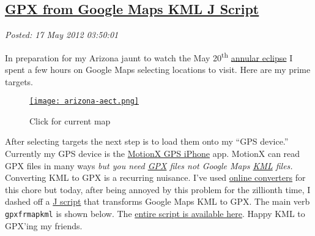 %

\subsection*{\href{https://bakerjd99.wordpress.com/2012/05/16/gpx-from-google-maps-kml-j-script/}{GPX from Google Maps KML J Script}}


\noindent\emph{Posted: 17 May 2012 03:50:01}
\vspace{6pt}

In preparation for my Arizona jaunt to watch the May
20\textsuperscript{th}
\href{http://eclipse-maps.com/Eclipse-Maps/Gallery/Pages/Annular\_solar\_eclipse\_of\_2012\_May\_20.html}{annular
eclipse} I spent a few hours on Google Maps selecting locations to
visit. Here are my prime targets.

\captionsetup[figure]{labelformat=empty}
\begin{figure}[htbp]
\centering
\href{http://maps.google.com/maps/ms?msid=213851645709730088342.0004bd67c9be9e39b4797&msa=0}{\texttt{[image: arizona-aect.png]}}
\caption{Click for current map}
\label{fig:119X0}
\end{figure}


After selecting targets the next step is to load them onto my ``GPS
device.'' Currently my GPS device is the
\href{http://gps.motionx.com/iphone/overview/}{MotionX GPS iPhone} app.
MotionX can read GPX files in many ways \emph{but you need
\href{http://www.topografix.com/gpx.asp}{GPX} files not Google Maps
\href{https://developers.google.com/kml/documentation/}{KML} files.}
Converting KML to GPX is a recurring nuisance. I've used
\href{http://kml2gpx.com/}{online converters} for this chore but today,
after being annoyed by this problem for the zillionth time, I dashed off
a \href{http://www.jsoftware.com/jwiki/FrontPage}{J script} that
transforms Google Maps KML to GPX. The main verb \texttt{gpxfrmapkml} is
shown below. The
\href{https://github.com/bakerjd99/jacks/blob/master/geotagged/gpxfrmapkml.ijs}{entire script is
available here}. Happy KML to GPX'ing my friends.

